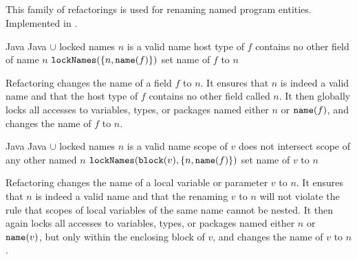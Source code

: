 \subsection{}
This family of refactorings is used for renaming named program entities. Implemented in .

\begin{algorithm}
\caption{$\refactoring{Rename Field}(f : \type{Field}, n : \type{Name})$}
\begin{algorithmic}[1]
\REQUIRE Java
\ENSURE Java $\cup$ locked names
\medskip
\STATE \assert $n$ is a valid name
\STATE \assert host type of $f$ contains no other field of name $n$
\STATE $\text{\texttt{lockNames}}(\{n, \text{\texttt{name}}(f)\})$
\STATE set name of $f$ to $n$
\end{algorithmic}
\end{algorithm}

Refactoring  changes the name of a field $f$ to $n$. It ensures that $n$ is indeed a valid name and that the host type of $f$ contains no other field called $n$. It then globally locks all accesses to variables, types, or packages named either $n$ or $\text{\texttt{name}}(f)$, and changes the name of $f$ to $n$.

\begin{algorithm}
\caption{$\refactoring{Rename Local}(v : \type{Local}, n : \type{Name})$}
\begin{algorithmic}[1]
\REQUIRE Java
\ENSURE Java $\cup$ locked names
\medskip
\STATE \assert $n$ is a valid name
\STATE \assert scope of $v$ does not intersect scope of any other  named $n$
\STATE $\text{\texttt{lockNames}}(\text{\texttt{block}}(v), \{n, \text{\texttt{name}}(f)\})$
\STATE set name of $v$ to $n$
\end{algorithmic}
\end{algorithm}

Refactoring  changes the name of a local variable or parameter $v$ to $n$. It ensures that $n$ is indeed a valid name and that the renaming $v$ to $n$ will not violate the rule that scopes of local variables of the same name cannot be nested. It then again locks all accesses to variables, types, or packages named either $n$ or $\text{\texttt{name}}(v)$, but only within the enclosing block of $v$, and changes the name of $v$ to $n$.

